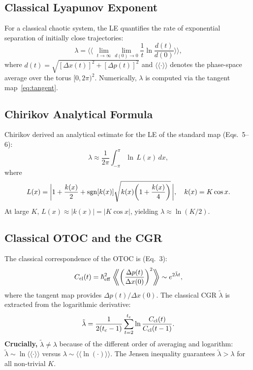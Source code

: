 \documentclass[11pt,a4paper]{article}
\newcommand{\hb}{\hbar_{\rm eff}}
\newcommand{\avg}[1]{\langle\!\langle #1 \rangle\!\rangle}
\begin{document}
\subsection{Classical Lyapunov Exponent}

For a classical chaotic system, the LE quantifies the rate of exponential separation of initially close trajectories:
\begin{equation}\label{eq:LE_def}
\lambda=\bigg\langle\!\!\!\bigg\langle\;
\lim_{t\to\infty}\lim_{d(0)\to 0}\frac{1}{t}\ln\frac{d(t)}{d(0)}
\bigg\rangle\!\!\!\bigg\rangle,
\end{equation}
where $d(t)=\sqrt{[\Delta x(t)]^{2}+[\Delta p(t)]^{2}}$ and $\avg{\cdot}$ denotes the phase-space average over the torus $[0,2\pi)^{2}$. Numerically, $\lambda$ is computed via the tangent map~\eqref{eq:tangent}.

\subsection{Chirikov Analytical Formula}

Chirikov derived an analytical estimate for the LE of the standard map (Eqs.~5--6):
\begin{equation}\label{eq:chirikov}
\lambda\approx\frac{1}{2\pi}\int_{-\pi}^{\pi}\!\!\ln\,L(x)\,dx,
\end{equation}
where
\begin{equation}\label{eq:chirikov_L}
L(x)=\bigg|1+\frac{k(x)}{2}+{\rm sgn}[k(x)]\sqrt{k(x)\!\left(1+\frac{k(x)}{4}\right)}\,\bigg|,\quad
k(x)=K\cos x.
\end{equation}
At large $K$, $L(x)\approx|k(x)|=|K\cos x|$, yielding $\lambda\approx\ln(K/2)$.

\subsection{Classical OTOC and the CGR}

The classical correspondence of the OTOC is (Eq.~3):
\begin{equation}\label{eq:Ccl}
C_{\rm cl}(t)=\hb^{2}\;\bigg\langle\!\!\!\bigg\langle\!
\left(\frac{\Delta p(t)}{\Delta x(0)}\right)^{2}\!
\bigg\rangle\!\!\!\bigg\rangle\sim e^{2\tilde{\lambda}t},
\end{equation}
where the tangent map provides $\Delta p(t)/\Delta x(0)$. The classical CGR $\tilde{\lambda}$ is extracted from the logarithmic derivative:
\begin{equation}\label{eq:CGR_deriv}
\tilde{\lambda}=\frac{1}{2(t_{c}-1)}\sum_{t=2}^{t_{c}}\ln\frac{C_{\rm cl}(t)}{C_{\rm cl}(t-1)}.
\end{equation}
\textbf{Crucially,} $\tilde{\lambda}\neq\lambda$ because of the different order of averaging and logarithm: $\tilde{\lambda}\sim\ln\avg{\cdot}$ versus $\lambda\sim\avg{\ln(\cdot)}$. The Jensen inequality guarantees $\tilde{\lambda}>\lambda$ for all non-trivial $K$.
\end{document}
